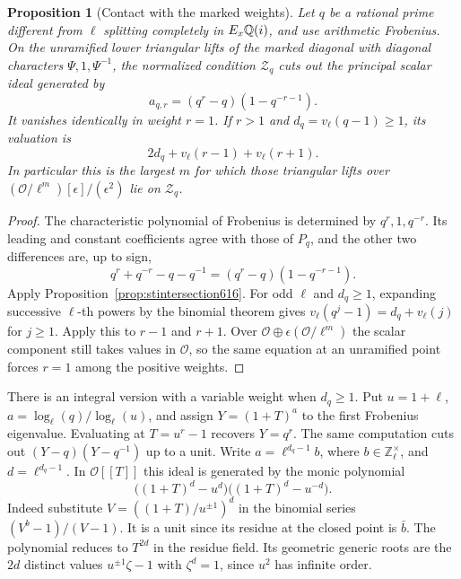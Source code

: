 \documentclass[a4paper,11pt]{article}
\newtheorem{proposition}{Proposition}[section]
\theoremstyle{definition}
\theoremstyle{remark}
\newcommand{\ZZ}{\mathbb Z}\newcommand{\ord}{\operatorname{ord}}
\numberwithin{equation}{section}
\newcommand{\OO}{\mathcal O}
\begin{document}
\begin{proposition}[Contact with the marked weights]\label{prop:stweight616}
Let \(q\) be a rational prime different from \(\ell\) splitting completely
in \(E_x\mathbb Q(i)\), and use arithmetic Frobenius. On the unramified
lower triangular lifts of the marked diagonal with diagonal characters
\(\Psi,1,\Psi^{-1}\), the normalized condition \(\mathcal Z_q\) cuts
out the principal scalar ideal generated by
\[
             a_{q,r}=(q^r-q)(1-q^{-r-1}).
\]
It vanishes identically in weight \(r=1\). If \(r>1\) and
\(d_q=v_\ell(q-1)\ge1\), its valuation is
\[
       2d_q+v_\ell(r-1)+v_\ell(r+1).
\]
In particular this is the largest \(m\) for which those triangular
lifts over \((\OO/\ell^m)[\epsilon]/(\epsilon^2)\) lie on
\(\mathcal Z_q\).
\end{proposition}
\begin{proof}
The characteristic polynomial of Frobenius is determined by
\(q^r,1,q^{-r}\). Its leading and constant coefficients agree with
those of \(P_q\), and the other two differences are, up to sign,
\[
       q^r+q^{-r}-q-q^{-1}=(q^r-q)(1-q^{-r-1}).
\]
Apply Proposition~\ref{prop:stintersection616}. For odd \(\ell\) and
\(d_q\ge1\), expanding successive \(\ell\)-th powers by the binomial
theorem gives \(v_\ell(q^j-1)=d_q+v_\ell(j)\) for \(j\ge1\).
Apply this to \(r-1\) and \(r+1\). Over
\(\OO\oplus\epsilon(\OO/\ell^m)\) the scalar component still takes
values in \(\OO\), so the same equation at an unramified point forces
\(r=1\) among the positive weights.
\end{proof}

There is an integral version with a variable weight when \(d_q\ge1\).
Put \(u=1+\ell\), \(a=\log_\ell(q)/\log_\ell(u)\), and assign
\(Y=(1+T)^a\) to the first Frobenius eigenvalue. Evaluating at
\(T=u^r-1\) recovers \(Y=q^r\). The same computation cuts out
\((Y-q)(Y-q^{-1})\) up to a unit. Write \(a=\ell^{d_q-1}b\), where
\(b\in\ZZ_\ell^\times\), and \(d=\ell^{d_q-1}\). In \(\OO[[T]]\)
this ideal is generated by the monic polynomial
\[
     \big((1+T)^d-u^d\big)\big((1+T)^d-u^{-d}\big).
\]
Indeed substitute \(V=((1+T)/u^{\pm1})^d\) in the binomial series
\((V^b-1)/(V-1)\). It is a unit since its residue at the closed
point is \(\bar b\). The polynomial reduces to \(T^{2d}\) in the
residue field. Its geometric generic roots are the \(2d\) distinct
values \(u^{\pm1}\zeta-1\) with \(\zeta^d=1\), since \(u^2\) has
infinite order.
\end{document}
